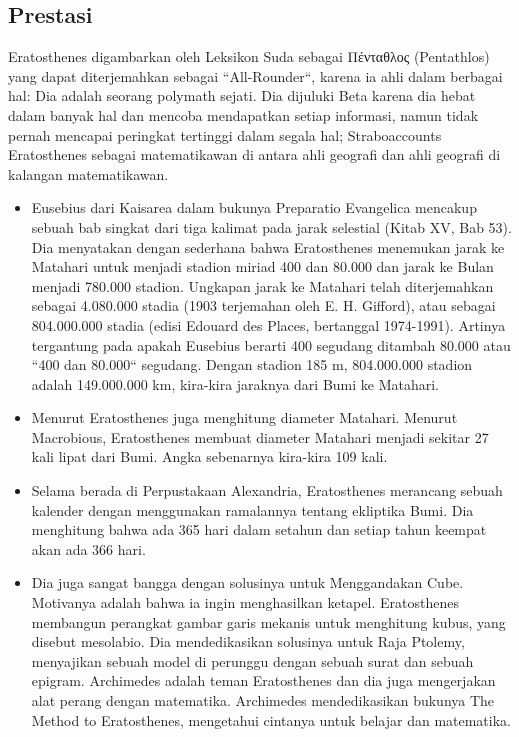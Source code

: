 \subsection{Prestasi}
Eratosthenes digambarkan oleh Leksikon Suda sebagai Πένταθλος (Pentathlos) yang dapat diterjemahkan sebagai ``All-Rounder``, karena ia ahli dalam berbagai hal: Dia adalah seorang polymath sejati. Dia dijuluki Beta karena dia hebat dalam banyak hal dan mencoba mendapatkan setiap informasi, namun tidak pernah mencapai peringkat tertinggi dalam segala hal; Straboaccounts Eratosthenes sebagai matematikawan di antara ahli geografi dan ahli geografi di kalangan matematikawan.
\begin{itemize}
 
\item Eusebius dari Kaisarea dalam bukunya Preparatio Evangelica mencakup sebuah bab singkat dari tiga kalimat pada jarak selestial (Kitab XV, Bab 53). Dia menyatakan dengan sederhana bahwa Eratosthenes menemukan jarak ke Matahari untuk menjadi stadion miriad 400 dan 80.000 dan jarak ke Bulan menjadi 780.000 stadion. Ungkapan jarak ke Matahari telah diterjemahkan sebagai 4.080.000 stadia (1903 terjemahan oleh E. H. Gifford), atau sebagai 804.000.000 stadia (edisi Edouard des Places, bertanggal 1974-1991). Artinya tergantung pada apakah Eusebius berarti 400 segudang ditambah 80.000 atau ``400 dan 80.000`` segudang. Dengan stadion 185 m, 804.000.000 stadion adalah 149.000.000 km, kira-kira jaraknya dari Bumi ke Matahari.
\item Menurut \cite{smith2005dictionary} Eratosthenes juga menghitung diameter Matahari. Menurut Macrobious, Eratosthenes membuat diameter Matahari menjadi sekitar 27 kali lipat dari Bumi. Angka sebenarnya kira-kira 109 kali.
\item Selama berada di Perpustakaan Alexandria, Eratosthenes merancang sebuah kalender dengan menggunakan ramalannya tentang ekliptika Bumi. Dia menghitung bahwa ada 365 hari dalam setahun dan setiap tahun keempat akan ada 366 hari.
\item Dia juga sangat bangga dengan solusinya untuk Menggandakan Cube. Motivanya adalah bahwa ia ingin menghasilkan ketapel. Eratosthenes membangun perangkat gambar garis mekanis untuk menghitung kubus, yang disebut mesolabio. Dia mendedikasikan solusinya untuk Raja Ptolemy, menyajikan sebuah model di perunggu dengan sebuah surat dan sebuah epigram. Archimedes adalah teman Eratosthenes dan dia juga mengerjakan alat perang dengan matematika. Archimedes mendedikasikan bukunya The Method to Eratosthenes, mengetahui cintanya untuk belajar dan matematika. \cite{chondros2010archimedes}
\end{itemize}
